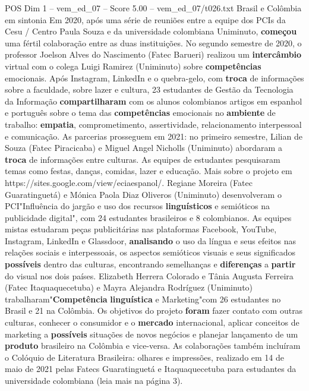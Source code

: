 \begin{textsample}{POS Dim 1 – vem\_ed\_07 – Score 5.00 – vem\_ed\_07/t026.txt}  \label{ex:f1_pos_184}
Brasil e Colômbia em sintonia Em 2020, após uma série de reuniões entre a equipe dos PCIs da Cesu / Centro Paula Souza e da universidade colombiana Uniminuto, \textbf{começou} uma fértil colaboração entre as duas instituições.
No segundo semestre de 2020, o professor Joelson Alves do Nascimento (Fatec Barueri) realizou um \textbf{intercâmbio} virtual com o colega Luigi Ramirez (Uniminuto) sobre \textbf{competências} emocionais.
Após Instagram, LinkedIn e o quebra-gelo, com \textbf{troca} de informações sobre a faculdade, sobre lazer e cultura, 23 estudantes de Gestão da Tecnologia da Informação \textbf{compartilharam} com os alunos colombianos artigos em espanhol e português sobre o tema das \textbf{competências} emocionais no \textbf{ambiente} de trabalho: \textbf{empatia}, comprometimento, assertividade, relacionamento interpessoal e comunicação.
As parcerias prosseguem em 2021: no primeiro semestre, Lilian de Souza (Fatec Piracicaba) e Miguel Angel Nicholls (Uniminuto) abordaram a \textbf{troca} de informações entre culturas.
As equipes de estudantes pesquisaram temas como festas, danças, comidas, lazer e educação.
Mais sobre o projeto em https://sites.google.com/view/eciaespanol/.
Regiane Moreira (Fatec Guaratinguetá) e Mónica Paola Diaz Oliveros (Uniminuto) desenvolveram o PCI"Influência do jargão e uso dos recursos \textbf{linguísticos} e semióticos na publicidade digital", com 24 estudantes brasileiros e 8 colombianos.
As equipes mistas estudaram peças publicitárias nas plataformas Facebook, YouTube, Instagram, LinkedIn e Glassdoor, \textbf{analisando} o uso da língua e seus efeitos nas relações sociais e interpessoais, os aspectos semióticos visuais e seus significados \textbf{possíveis} dentro das culturas, encontrando semelhanças e \textbf{diferenças} a \textbf{partir} do visual nos dois países.
Elizabeth Herrera Colorado e Tânia Augusta Ferreira (Fatec Itaquaquecetuba) e Mayra Alejandra Rodríguez (Uniminuto) trabalharam"\textbf{Competência} \textbf{linguística} e Marketing"com 26 estudantes no Brasil e 21 na Colômbia.
Os objetivos do projeto \textbf{foram} fazer contato com outras culturas, conhecer o consumidor e o \textbf{mercado} internacional, aplicar conceitos de marketing a \textbf{possíveis} situações de novos negócios e planejar lançamento de um \textbf{produto} brasileiro na Colômbia e vice-versa.
As colaborações também incluíram o Colóquio de Literatura Brasileira: olhares e impressões, realizado em 14 de maio de 2021 pelas Fatecs Guaratinguetá e Itaquaquecetuba para estudantes da universidade colombiana (leia mais na página 3).

\end{textsample}
